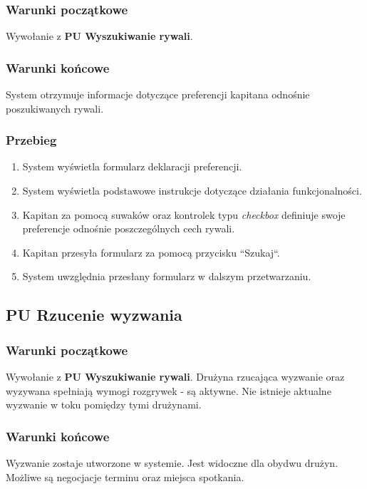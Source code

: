 \subsubsection{Warunki początkowe}

Wywołanie z \textbf{PU Wyszukiwanie rywali}.

\subsubsection{Warunki końcowe}

System otrzymuje informacje dotyczące preferencji kapitana odnośnie poszukiwanych rywali.

\subsubsection{Przebieg}
\begin{enumerate}
  \item System wyświetla formularz deklaracji preferencji.
  \item System wyświetla podstawowe instrukcje dotyczące działania funkcjonalności.
  \item Kapitan za pomocą suwaków oraz kontrolek typu \textit{checkbox} definiuje swoje preferencje odnośnie poszczególnych cech rywali.
  \item Kapitan przesyła formularz za pomocą przycisku ``Szukaj``.
  \item System uwzględnia przesłany formularz w dalszym przetwarzaniu. 
\end{enumerate}


\subsection*{PU Rzucenie wyzwania}

\subsubsection{Warunki początkowe}

Wywołanie z \textbf{PU Wyszukiwanie rywali}. Drużyna rzucająca wyzwanie oraz wyzywana spełniają wymogi rozgrywek - są aktywne. Nie istnieje aktualne wyzwanie w toku pomiędzy tymi drużynami.

\subsubsection{Warunki końcowe}

Wyzwanie zostaje utworzone w systemie. Jest widoczne dla obydwu drużyn. Możliwe są negocjacje terminu oraz miejsca spotkania.

